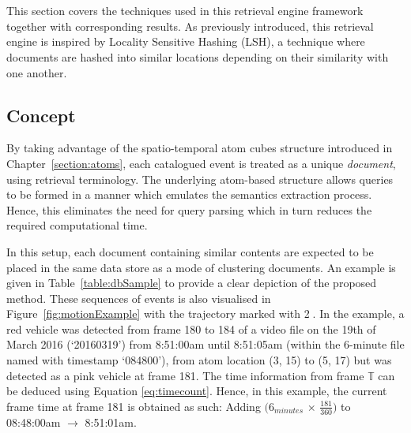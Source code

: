 \section{\versionOneRet}
\label{section:versionOne}
This section covers the techniques used in this retrieval engine
framework together with corresponding results. As previously introduced, this retrieval engine is inspired by Locality Sensitive Hashing (LSH), a technique where documents are hashed into similar locations depending on their similarity with one another. 

\vspace{1em}
\subsection{Concept}
\label{versionOneConcept}
By taking advantage of the spatio-temporal atom cubes structure introduced in
Chapter~\ref{section:atoms}, each catalogued event %
is treated as a
unique \emph{document}, using retrieval terminology. The underlying atom-based structure allows queries to be formed in a manner which emulates the semantics extraction process. Hence, this eliminates the need for query parsing which in turn reduces the required computational time.

In this setup, each document containing similar contents are expected to be placed in the same data store as a mode of clustering documents. An example is given in
Table~\ref{table:dbSample} to provide a clear depiction of the proposed
method. These sequences of events is also visualised in
Figure~\ref{fig:motionExample} with the trajectory marked with \textcircled{2}.
In the example, a red vehicle was detected from frame 180 to 184 of a video file on the 19th of March 2016 (`20160319') from 8:51:00am until 8:51:05am (within the 6-minute file named with timestamp `084800'), from atom location (3, 15)
to (5, 17) but was detected as a pink vehicle at frame 181.
The time information from frame $\mathbb{T}$ can be deduced using Equation \ref{eq:timecount}.
Hence, in this example, the
current frame time at frame 181 is obtained as such: Adding $(6_{minutes}$ $\times$ $\frac{181}{360})$ to 08:48:00am $\rightarrow$ 8:51:01am.

